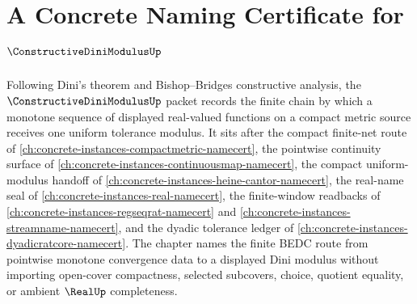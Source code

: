 \chapter{A Concrete Naming Certificate for $\ConstructiveDiniModulusUp$}
\label{ch:concrete-instances-constructive-dini-modulus-namecert}

Following Dini's theorem and Bishop--Bridges constructive analysis, the $\ConstructiveDiniModulusUp$ packet records the finite chain by which a monotone sequence of displayed real-valued functions on a compact metric source receives one uniform tolerance modulus. It sits after the compact finite-net route of \autoref{ch:concrete-instances-compactmetric-namecert}, the pointwise continuity surface of \autoref{ch:concrete-instances-continuousmap-namecert}, the compact uniform-modulus handoff of \autoref{ch:concrete-instances-heine-cantor-namecert}, the real-name seal of \autoref{ch:concrete-instances-real-namecert}, the finite-window readbacks of \autoref{ch:concrete-instances-regseqrat-namecert} and \autoref{ch:concrete-instances-streamname-namecert}, and the dyadic tolerance ledger of \autoref{ch:concrete-instances-dyadicratcore-namecert}. The chapter names the finite BEDC route from pointwise monotone convergence data to a displayed Dini modulus without importing open-cover compactness, selected subcovers, choice, quotient equality, or ambient $\RealUp$ completeness.

